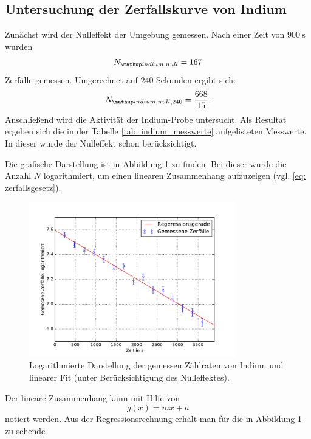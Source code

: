 \subsection{Untersuchung der Zerfallskurve von Indium}
Zunächst wird der Nulleffekt der Umgebung gemessen.
Nach einer Zeit von $\SI{900}{\second}$ wurden
\begin{equation*}
  N\ua{indium,null}=167
\end{equation*}
Zerfälle gemessen. Umgerechnet auf $240$ Sekunden ergibt sich:
\begin{equation}
  \label{eq:nulleffekt_indium}
   N\ua{indium,null,240}=\frac{668}{15}.
\end{equation}
Anschließend wird die Aktivität der Indium-Probe untersucht. %
Als Resultat ergeben sich die in der Tabelle \ref{tab: indium_messwerte} aufgelisteten Messwerte. %
In dieser wurde der Nulleffekt schon berücksichtigt.

Die grafische Darstellung ist in Abbildung \ref{fig: plot_indium} zu finden. Bei dieser wurde%
die Anzahl $N$ logarithmiert, um einen linearen Zusammenhang aufzuzeigen (vgl. \eqref{eq: zerfallsgesetz}).
\begin{figure}
  \centering
  \includegraphics[width=0.8\textwidth]{pics/logarithmiert_indium.pdf}
  \caption{Logarithmierte Darstellung der gemessen Zählraten von Indium und linearer Fit  (unter Berücksichtigung des Nulleffektes).} %
  \label{fig: plot_indium}
\end{figure}
Der lineare Zusammenhang kann mit Hilfe von
\begin{equation*}
  g(x)=mx+a
\end{equation*}
notiert werden.
Aus der Regressionsrechnung erhält man für die in Abbildung \ref{fig: plot_indium} zu sehende %
